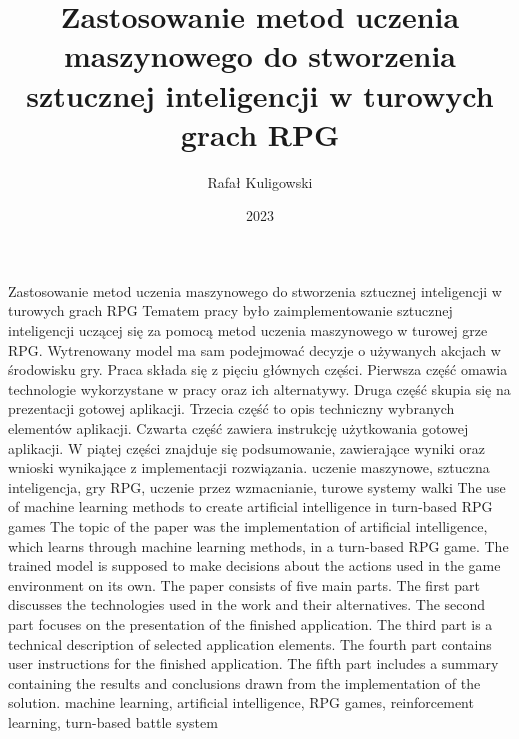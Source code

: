 \documentclass{SGGW-thesis}
\title{Zastosowanie metod uczenia maszynowego do stworzenia sztucznej inteligencji w turowych grach RPG}
\author{Rafał Kuligowski}
\date{2023}
\begin{document}
\makeatletter
\g@addto@macro{\UrlBreaks}{%
\do\/\do\a\do\b\do\c\do\d\do\e\do\f%
\do\g\do\h\do\i\do\j\do\k\do\l\do\m%
\do\n\do\o\do\p\do\q\do\r\do\s\do\t%
\do\u\do\v\do\w\do\x\do\y\do\z%
\do\A\do\B\do\C\do\D\do\E\do\F\do\G%
\do\H\do\I\do\J\do\K\do\L\do\M\do\N%
\do\O\do\P\do\Q\do\R\do\S\do\T\do\U%
\do\V\do\W\do\X\do\Y\do\Z}
\makeatother

\maketitle
\statementpage
\abstractpage
{Zastosowanie metod uczenia maszynowego do stworzenia sztucznej inteligencji w turowych grach RPG}
{Tematem pracy było zaimplementowanie sztucznej inteligencji uczącej się za pomocą metod uczenia maszynowego w turowej grze RPG. 
Wytrenowany model ma sam podejmować decyzje o używanych akcjach w środowisku gry. Praca składa się z pięciu głównych części.
Pierwsza część omawia technologie wykorzystane w pracy oraz ich alternatywy. Druga część skupia się na prezentacji gotowej aplikacji.
Trzecia część to opis techniczny wybranych elementów aplikacji. Czwarta część zawiera instrukcję użytkowania gotowej aplikacji. 
W piątej części znajduje się podsumowanie, zawierające wyniki oraz wnioski wynikające z implementacji rozwiązania.}
{uczenie maszynowe, sztuczna inteligencja, gry RPG, uczenie przez wzmacnianie, turowe systemy walki}
{The use of machine learning methods to create artificial intelligence in turn-based RPG games}
{The topic of the paper was the implementation of artificial intelligence, which learns through machine learning methods, in a turn-based RPG game.
The trained model is supposed to make decisions about the actions used in the game environment on its own.
The paper consists of five main parts. The first part discusses the technologies used in the work and their alternatives. The second part focuses on the presentation of the finished application.
The third part is a technical description of selected application elements. The fourth part contains user instructions for the finished application. The fifth part includes 
a summary containing the results and conclusions drawn from the implementation of the solution.}
{machine learning, artificial intelligence, RPG games, reinforcement learning, turn-based battle system}


{
  \doublespacing
  \tableofcontents
}
\end{document}
